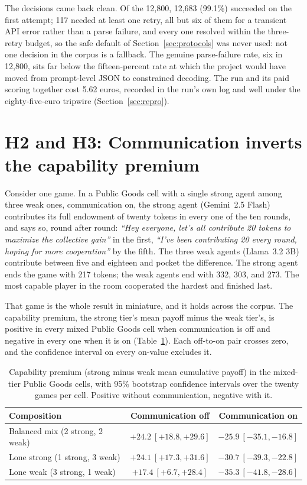 The decisions came back clean. Of the 12,800, 12,683 (99.1\%) succeeded on the first
attempt; 117 needed at least one retry, all but six of them for a transient API error
rather than a parse failure, and every one resolved within the three-retry budget, so the
safe default of Section~\ref{sec:protocols} was never used: not one decision in the corpus
is a fallback. The genuine parse-failure rate, six in 12,800, sits far below the
fifteen-percent rate at which the project would have moved from prompt-level JSON to
constrained decoding. The run and its paid scoring together cost 5.62 euros, recorded
in the run's own log and well under the eighty-five-euro tripwire
(Section~\ref{sec:repro}).

\section{H2 and H3: Communication inverts the capability premium}
\label{sec:res-premium}

Consider one game. In a Public Goods cell with a single strong agent among three weak
ones, communication on, the strong agent (Gemini~2.5 Flash) contributes its full
endowment of twenty tokens in every one of the ten rounds, and says so, round after
round: \emph{``Hey everyone, let's all contribute 20 tokens to maximize the collective
gain''} in the first, \emph{``I've been contributing 20 every round, hoping for more
cooperation''} by the fifth. The three weak agents (Llama~3.2 3B) contribute between
five and eighteen and pocket the difference. The strong agent ends the game with 217
tokens; the weak agents end with 332, 303, and 273. The most capable player in the room
cooperated the hardest and finished last.

That game is the whole result in miniature, and it holds across the corpus. The
capability premium, the strong tier's mean payoff minus the weak tier's, is positive in
every mixed Public Goods cell when communication is off and negative in every one when
it is on (Table~\ref{tab:premium}). Each off-to-on pair crosses zero, and the confidence
interval on every on-value excludes it.

\begin{table}[t]
\centering
\caption{Capability premium (strong minus weak mean cumulative payoff) in the
mixed-tier Public Goods cells, with 95\% bootstrap confidence intervals over the twenty
games per cell. Positive without communication, negative with it.}
\label{tab:premium}
\small
\begin{tabular}{lcc}
\toprule
Composition & Communication off & Communication on \\
\midrule
Balanced mix (2 strong, 2 weak) & $+24.2\ [+18.8, +29.6]$ & $-25.9\ [-35.1, -16.8]$ \\
Lone strong (1 strong, 3 weak) & $+24.1\ [+17.3, +31.6]$ & $-30.7\ [-39.3, -22.8]$ \\
Lone weak (3 strong, 1 weak) & $+17.4\ [+6.7, +28.4]$ & $-35.3\ [-41.8, -28.6]$ \\
\bottomrule
\end{tabular}
\end{table}

